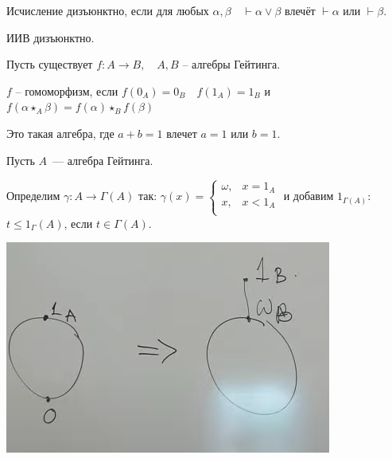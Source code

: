 \begin{definition}
    Исчисление дизъюнктно, если для любых $\alpha, \beta\quad \vdash \alpha \lor \beta$ влечёт $\vdash \alpha$ или $\vdash \beta$.
\end{definition}

\begin{theorem}
    ИИВ дизъюнктно.
\end{theorem}

\begin{definition}
    Пусть существует $f: A \to B, \quad A, B$ -- алгебры Гейтинга.

    $f$ -- гомоморфизм, если $f(0_A) = 0_B\quad f(1_A) = 1_B$ и $f(\alpha \star_A \beta) = f(\alpha) \star_B f(\beta)$
\end{definition}

\begin{definition}
    Это такая алгебра, где $a + b = 1$ влечет $a = 1$ или $b = 1$.
\end{definition}

\begin{definition}
    [$\Gamma (A)$]
    Пусть $A$~--- алгебра Гейтинга.

    Определим $\gamma: A \to \Gamma(A)$ так:
    $\gamma(x) = \begin{cases}
        \omega, &x = 1_A\\
        x, & x < 1_A\\
    \end{cases}$
    и добавим $1_{\Gamma(A)}$: $t \leqslant 1_\Gamma(A)$, если $t \in \Gamma(A)$.

    \begin{center}
        \includegraphics[scale=0.5]{img/gedelerisation.png}
    \end{center}
\end{definition}

